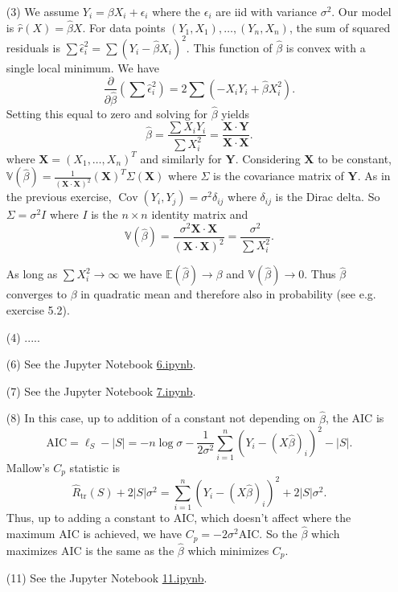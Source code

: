 \documentclass[10pt]{article}
\newcommand{\V}{\mathbb{V}}
\newcommand{\E}{\mathbb{E}}
\newcommand{\Cov}{\operatorname{Cov}}
\begin{document}
\begin{enumerate}
\item[(3)]
We assume $Y_i = \beta X_i + \epsilon_i$ where the $\epsilon_i$ are iid with
variance $\sigma^2$.
Our model is $\hat r(X)=\hat \beta X$. For data points $(Y_1,X_1), \ldots, (Y_n,X_n)$,
the sum of squared residuals is
$\sum \hat \epsilon_i^2 = \sum (Y_i - \hat \beta X_i)^2$. This function of $\hat \beta$
is convex with a single local minimum. We have
\[
\frac{\partial}{\partial \hat\beta} \left(\sum \hat \epsilon_i^2\right) =
2 \sum \left(-X_iY_i + \hat \beta X_i^2\right).
\]
Setting this equal to zero and solving for $\hat\beta$ yields
\[
\hat\beta = \frac{\sum X_iY_i}{\sum X_i^2} = \frac{\mathbf X \cdot \mathbf Y}
{\mathbf X \cdot \mathbf X}.
\]
where $\mathbf X = (X_1,\ldots,X_n)^T$ and similarly for $\mathbf Y$. Considering
$\mathbf X$ to be constant, $\V(\hat \beta) =
\frac{1}{(\mathbf X \cdot \mathbf X)^2} (\mathbf X)^T \Sigma (\mathbf X)$
where $\Sigma$ is the covariance
matrix of $\mathbf Y$. As in the previous exercise,
$\Cov(Y_i,Y_j)=\sigma^2 \delta_{ij}$
where $\delta_{ij}$ is the Dirac delta. So $\Sigma=\sigma^2 I$ where $I$ is the
$n\times n$ identity matrix and
\[
\V(\hat\beta) = \frac{\sigma^2 \mathbf X \cdot \mathbf X}
{(\mathbf X \cdot \mathbf X)^2}
= \frac{\sigma^2}{\sum X_i^2}.
\]

As long as $\sum X_i^2 \to \infty$ we have $\E(\hat \beta)\to \beta$ and
$\V(\hat \beta)\to 0$. Thus $\hat \beta$ converges to $\beta$ in quadratic mean
and therefore also in probability (see e.g. exercise 5.2).

\item[(4)] .....

\item[(6)]
See the Jupyter Notebook
\href{https://github.com/ajrasmus/some_of_statistics/blob/main/chapter_13/6.ipynb}{6.ipynb}.

\item[(7)]
See the Jupyter Notebook
\href{https://github.com/ajrasmus/some_of_statistics/blob/main/chapter_13/7.ipynb}{7.ipynb}.

\item[(8)]
In this case, up to addition of a constant not depending on $\hat \beta$,
the AIC is
\[
\text{AIC} = \ell_S - |S| = -n\log \sigma - \frac{1}{2\sigma^2}\sum_{i=1}^n
(Y_i - (X \hat \beta)_i)^2 - |S|.
\]
Mallow's $C_p$ statistic is
\[
\hat R_{\text{tr}}(S) + 2 |S| \sigma^2 = \sum_{i=1}^n (Y_i - (X \hat \beta)_i)^2 +
2 |S|\sigma^2.
\]
Thus, up to adding a constant to $\text{AIC}$, which doesn't affect where the maximum
$\text{AIC}$ is achieved, we have $C_p = - 2\sigma^2 \text{AIC}$. So the $\hat \beta$
which maximizes $\text{AIC}$ is the same as the $\hat \beta$ which minimizes $C_p$.

\item[(11)]
See the Jupyter Notebook
\href{https://github.com/ajrasmus/some_of_statistics/blob/main/chapter_13/11.ipynb}{11.ipynb}.

\end{enumerate}
\end{document}
